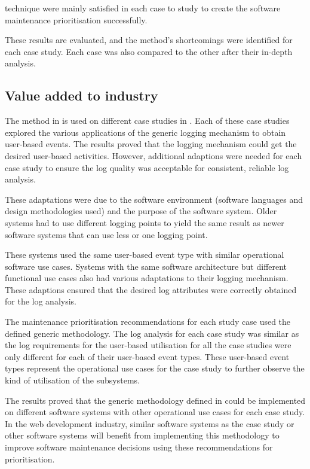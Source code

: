 technique were mainly satisfied in each case to study to create the software maintenance prioritisation successfully.\par These results are evaluated, and the method's shortcomings were identified for each case study. Each case was also compared to the other after their in-depth analysis.

\clearpage

\subsection{Value added to industry}
The method in  is used on different case studies in . Each of these case studies explored the various applications of the generic logging mechanism to obtain user-based events. The results proved that the logging mechanism could get the desired user-based activities. However, additional adaptions were needed for each case study to ensure the log quality was acceptable for consistent, reliable log analysis.\par These adaptations were due to the software environment (software languages and design methodologies used) and the purpose of the software system. Older systems had to use different logging points to yield the same result as newer software systems that can use less or one logging point.\par These systems used the same user-based event type with similar operational software use cases. Systems with the same software architecture but different functional use cases also had various adaptations to their logging mechanism. These adaptions ensured that the desired log attributes were correctly obtained for the log analysis. \par The maintenance prioritisation recommendations for each study case used the defined generic methodology. The log analysis for each case study was similar as the log requirements for the user-based utilisation for all the case studies were only different for each of their user-based event types. These user-based event types represent the operational use cases for the case study to further observe the kind of utilisation of the subsystems. \par The results proved that the generic methodology defined in  could be implemented on different software systems with other operational use cases for each case study. In the web development industry, similar software systems as the case study or other software systems will benefit from implementing this methodology to improve software maintenance decisions using these recommendations for prioritisation.

